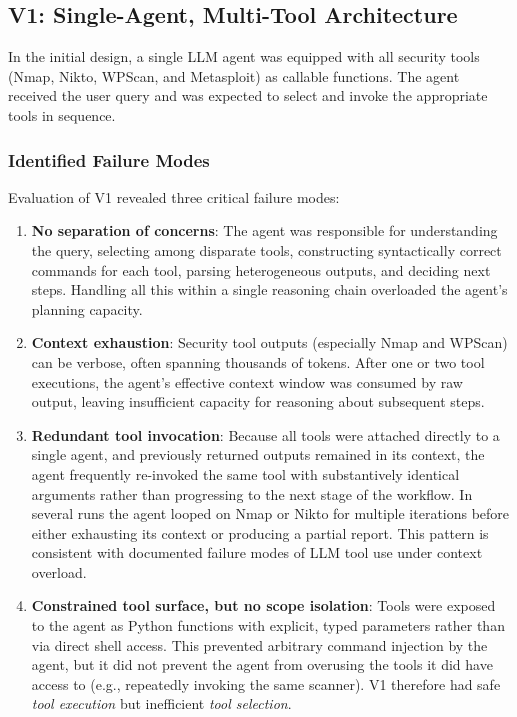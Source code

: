 \documentclass[sigconf,anonymous]{acmart}
\begin{document}
\subsection{V1: Single-Agent, Multi-Tool Architecture}

In the initial design, a single LLM agent was equipped with all security tools (Nmap, Nikto, WPScan, and Metasploit) as callable functions. The agent received the user query and was expected to select and invoke the appropriate tools in sequence.

\subsubsection{Identified Failure Modes}

Evaluation of V1 revealed three critical failure modes:

\begin{enumerate}[leftmargin=*]
    \item \textbf{No separation of concerns}: The agent was responsible for understanding the query, selecting among disparate tools, constructing syntactically correct commands for each tool, parsing heterogeneous outputs, and deciding next steps. Handling all this within a single reasoning chain overloaded the agent's planning capacity.

    \item \textbf{Context exhaustion}: Security tool outputs (especially Nmap and WPScan) can be verbose, often spanning thousands of tokens. After one or two tool executions, the agent's effective context window was consumed by raw output, leaving insufficient capacity for reasoning about subsequent steps.

    \item \textbf{Redundant tool invocation}: Because all tools were attached directly to a single agent, and previously returned outputs remained in its context, the agent frequently re-invoked the same tool with substantively identical arguments rather than progressing to the next stage of the workflow. In several runs the agent looped on Nmap or Nikto for multiple iterations before either exhausting its context or producing a partial report. This pattern is consistent with documented failure modes of LLM tool use under context overload.

    \item \textbf{Constrained tool surface, but no scope isolation}: Tools were exposed to the agent as Python functions with explicit, typed parameters rather than via direct shell access. This prevented arbitrary command injection by the agent, but it did not prevent the agent from overusing the tools it did have access to (e.g., repeatedly invoking the same scanner). V1 therefore had safe \emph{tool execution} but inefficient \emph{tool selection}.
    
\end{enumerate}
\end{document}
